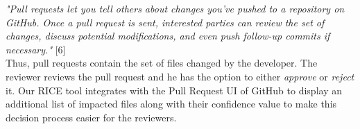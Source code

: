 \textit{"Pull requests let you tell others about changes you've pushed to a repository on GitHub. Once a pull request is sent, interested parties can review the set of changes, discuss potential modifications, and even push follow-up commits if necessary."} [6] \\

Thus, pull requests contain the set of files changed by the developer. The reviewer reviews the pull request and he has the option to either \textit{approve} or \textit{reject} it. Our RICE tool integrates with the Pull Request UI of GitHub to display an additional list of impacted files along with their confidence value to make this decision process easier for the reviewers.   


